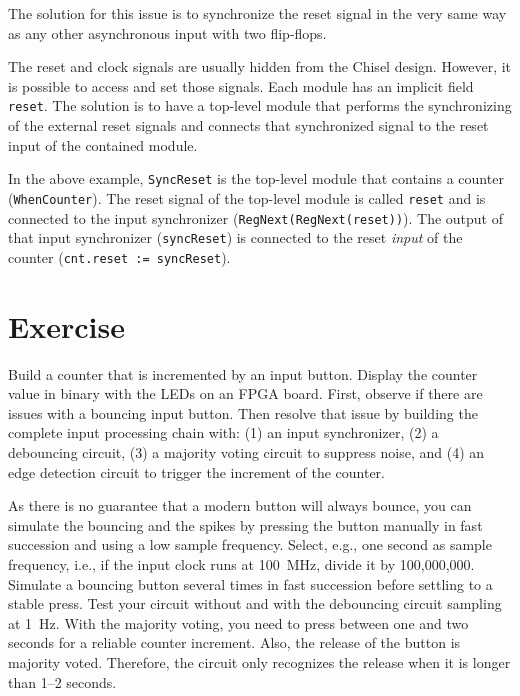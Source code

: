\documentclass[%
    10pt,
    headinclude, footinclude=false,
    openright, %
    notitlepage,
    cleardoublepage=empty,
    headsepline,
    numbers=noenddot,
    bibliography=totoc, index=totoc,
    ]{scrbook}
\newcommand{\code}[1]{{\lstinline[basicstyle=\small\ttfamily]{#1}}}
\begin{document}
The solution for this issue is to synchronize the reset signal in the very same way as
any other asynchronous input with two flip-flops.

The reset and clock signals are usually hidden from the Chisel design.
However, it is possible to access and set those signals. Each module has an implicit field
\code{reset}. The solution is to have a top-level module that performs the synchronizing
of the external reset signals and connects that synchronized signal to the reset input
of the contained module.


In the above example, \code{SyncReset} is the top-level module that contains a
counter (\code{WhenCounter}). The reset signal of the top-level module is called
\code{reset} and is connected to the input synchronizer (\code{RegNext(RegNext(reset))}).
The output of that input synchronizer (\code{syncReset}) is connected to the reset \emph{input}
of the counter (\code{cnt.reset := syncReset}).


\section{Exercise}

Build a counter that is incremented by an input button.
Display the counter value in binary with the LEDs on an FPGA board.
First, observe if there are issues with a bouncing input button.
Then resolve that issue by building
the complete input processing chain with: (1) an input synchronizer,
(2) a debouncing circuit, (3) a majority voting circuit to suppress noise,
and (4) an edge detection circuit to trigger the increment of the counter.

As there is no guarantee that a modern button will always bounce, you can
simulate the bouncing and the spikes by pressing the button manually in fast succession
and using a low sample frequency. Select, e.g., one second as sample frequency,
i.e., if the input clock runs at 100~MHz, divide it by 100,000,000.
Simulate a bouncing button several times in fast succession
before settling to a stable press. Test your circuit without and with the
debouncing circuit sampling at 1~Hz.
With the majority voting, you need to press between one and two seconds
for a reliable counter increment. Also, the release of the button is
majority voted. Therefore, the circuit only recognizes the release when it is
longer than 1--2 seconds.
\end{document}
